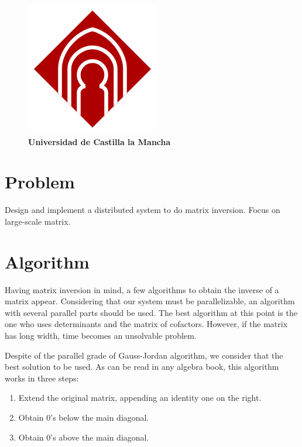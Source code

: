 \documentclass[a4paper,10pt,oneside]{article}
\title{\hrulefill\\ \textbf{\begin{huge}DISTRIBUTED SYSTEMS ARCHITECTURE\end{huge}\\ \  \\ \begin{Large}\textbf{Lab Assignment 1: Distributed Matrix Inversion}\end{Large}}}
\author{\textbf{\begin{Large}Javier Angulo Lucerón\end{Large}}\\ \textbf{\begin{large}$<$javier.angulo1@alu.uclm.es$>$\end{large}} \\ \\  \textbf{\begin{Large}César Mora Castro\end{Large}}\\ \textbf{\begin{large}$<$cesar.mora@alu.uclm.es$>$\end{large}} \\ \\ \textbf{\begin{large}Curso 2010 - 2011\end{large}}}
\date{\textbf{\begin{large}Ingeniería Superior en Informática - Escuela Superior de Informática de Ciudad Real\end{large}}\\\hrulefill}
\begin{document}
\thispagestyle{empty}
\maketitle
\begin{figure}[b]
\begin{center}
\includegraphics[scale=0.4]{graficos/logouclm.png} 
\\
\large{\textbf{Universidad de Castilla la Mancha}}
\end{center}
\end{figure}
\thispagestyle{empty}
\FloatBarrier
\newpage
\tableofcontents
\newpage
\parskip 0.2cm

\section{Problem}
Design and implement a distributed system to do matrix inversion. Focus on large-scale matrix.

\section{Algorithm}
Having matrix inversion in mind, a few algorithms to obtain the inverse of a matrix appear. Considering that our system must be parallelizable, an algorithm with several parallel parts should be used. The best algorithm at this point is the one who uses determinants and the matrix of cofactors. However, if the matrix has long width, time becomes an unsolvable problem.

Despite of the parallel grade of Gauss-Jordan algorithm, we consider that the best solution to be used. As can be read in any algebra book, this algorithm works in three steps:

\begin{enumerate}
\item Extend the original matrix, appending an identity one on the right.
\item Obtain 0's below the main diagonal.
\item Obtain 0's above the main diagonal.
\end{enumerate}
\end{document}
